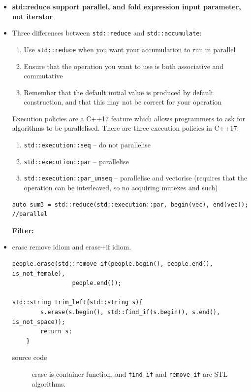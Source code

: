 \documentclass[a4paper,11pt,twoside]{book}
\begin{document}
\begin{itemize}
	\item \textbf{std::reduce support parallel, and fold expression input parameter, not iterator}
	
			\item Three differences between \texttt{std::reduce} and \texttt{std::accumulate}:
	\begin{enumerate}	
			\item Use \texttt{std::reduce} when you want your accumulation to run in parallel
			\item Ensure that the operation you want to use is both associative and commutative
			\item Remember that the default initial value is produced by default construction, and that this may not be correct for your operation
		\end{enumerate}	
	
Execution policies are a C++17 feature which allows programmers to ask for algorithms to be parallelised. There are three execution policies in C++17:
\begin{enumerate}
\item \texttt{std::execution::seq} – do not parallelise
\item \texttt{std::execution::par} – parallelise
\item \texttt{std::execution::par\_unseq} – parallelise and vectorise (requires that the operation can be interleaved, so no acquiring mutexes and such)
\end{enumerate}
	
\begin{lstlisting}
auto sum3 = std::reduce(std::execution::par, begin(vec), end(vec)); //parallel
\end{lstlisting}

\textbf{Filter:}

	\item erase remove idiom and erase+if idiom.
	
\begin{lstlisting}
people.erase(std::remove_if(people.begin(), people.end(), is_not_female), 
                 people.end());

std::string trim_left{std::string s){
		s.erase(s.begin(), std::find_if(s.begin(), s.end(), is_not_space));
		return s;
	}
\end{lstlisting}
\begin{description}
		\item[source code] erase is container function, and \texttt{find\_if} and \texttt{remove\_if} are STL algorithms. 
\end{description}


\end{itemize}
\end{document}
